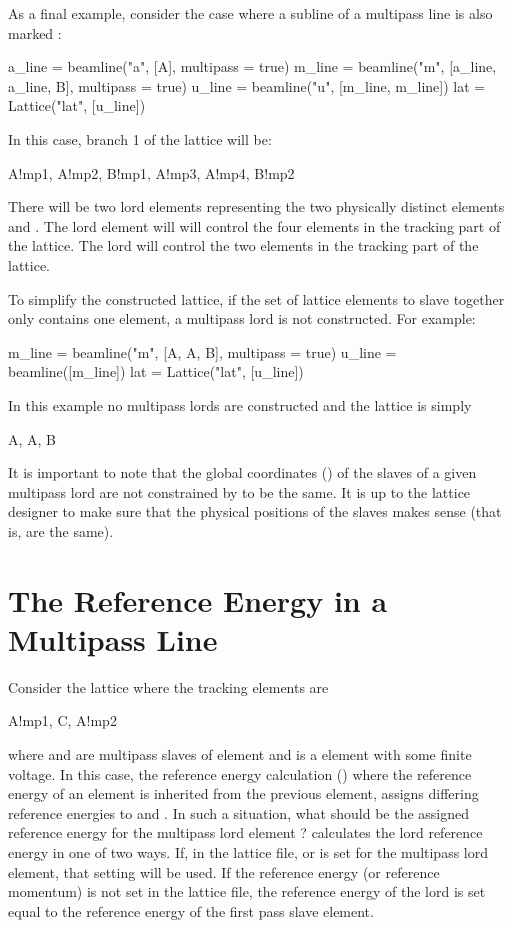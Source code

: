 As a final example, consider the case where a subline of a multipass line is also marked
:
\begin{example}
  a_line = beamline("a", [A], multipass = true)
  m_line = beamline("m", [a_line, a_line, B], multipass = true)
  u_line = beamline("u", [m_line, m_line])
  lat = Lattice("lat", [u_line])
\end{example}
In this case, branch 1 of the lattice will be:
\begin{example}
  A!mp1, A!mp2, B!mp1, A!mp3, A!mp4, B!mp2
\end{example}
There will be two lord elements representing the two physically distinct elements  and .
The  lord element will will control the four  elements in the tracking
part of the lattice. The  lord will control the two  elements in the tracking part
of the lattice. 

To simplify the constructed lattice, if the set of lattice elements to slave together only contains
one element, a multipass lord is not constructed. For example:
\begin{example}
  m_line = beamline("m", [A, A, B], multipass = true)
  u_line = beamline([m_line])
  lat = Lattice("lat", [u_line])
\end{example}
In this example no multipass lords are constructed and the lattice is simply
\begin{example}
  A, A, B
\end{example}

It is important to note that the global coordinates () of the slaves of a given
multipass lord are not constrained by \accellat to be the same. It is up to the lattice designer to make
sure that the physical positions of the slaves makes sense (that is, are the same).

\section{The Reference Energy in a Multipass Line}
\label{s:ref.e.multi}

Consider the lattice where the tracking elements are
\begin{example}
  A!mp1, C, A!mp2
\end{example}
where  and  are multipass slaves of element  and  is a 
element with some finite voltage. In this case, the reference energy calculation ()
where the reference energy of an element is inherited from the previous element, assigns differing
reference energies to  and . In such a situation, what should be the assigned
reference energy for the multipass lord element ? \accellat calculates the lord reference energy
in one of two ways. If, in the lattice file,  or  is set for the multipass lord
element, that setting will be used. If the reference energy (or reference momentum) is not set in the lattice
file, the reference energy of the lord is set equal to the reference energy of the first pass slave
element.
